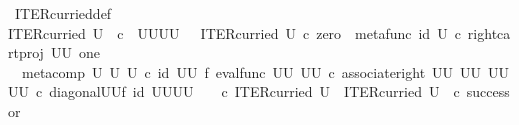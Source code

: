 \begin{isabellebody}
\isanewline
{}\isamarkupfalse%
\ ITER{\isacharunderscore}{\kern0pt}curried{\isacharunderscore}{\kern0pt}def{}{\isacharcolon}{\kern0pt}\ \isanewline
{\isachardoublequoteopen}ITER{\isacharunderscore}{\kern0pt}curried\ U\ {\isacharcolon}{\kern0pt}\ {\isasymnat}\isactrlsub c\ {\isasymrightarrow}\ {\isacharparenleft}{\kern0pt}U\isactrlbsup U\isactrlesup {\isacharparenright}{\kern0pt}\isactrlbsup U\isactrlbsup U\isactrlesup \isactrlesup \ {\isasymand}\ \ ITER{\isacharunderscore}{\kern0pt}curried\ U\ {\isasymcirc}\isactrlsub c\ zero\ {\isacharequal}{\kern0pt}\ {\isacharparenleft}{\kern0pt}metafunc\ {\isacharparenleft}{\kern0pt}id\ U{\isacharparenright}{\kern0pt}\ {\isasymcirc}\isactrlsub c\ {\isacharparenleft}{\kern0pt}right{\isacharunderscore}{\kern0pt}cart{\isacharunderscore}{\kern0pt}proj\ {\isacharparenleft}{\kern0pt}U\isactrlbsup U\isactrlesup {\isacharparenright}{\kern0pt}\ one{\isacharparenright}{\kern0pt}{\isacharparenright}{\kern0pt}\isactrlsup {\isasymsharp}\ {\isasymand}\isanewline
\ \ {\isacharparenleft}{\kern0pt}{\isacharparenleft}{\kern0pt}meta{\isacharunderscore}{\kern0pt}comp\ U\ U\ U{\isacharparenright}{\kern0pt}\ {\isasymcirc}\isactrlsub c\ {\isacharparenleft}{\kern0pt}id\ {\isacharparenleft}{\kern0pt}U\isactrlbsup U\isactrlesup {\isacharparenright}{\kern0pt}\ {\isasymtimes}\isactrlsub f\ eval{\isacharunderscore}{\kern0pt}func\ {\isacharparenleft}{\kern0pt}U\isactrlbsup U\isactrlesup {\isacharparenright}{\kern0pt}\ {\isacharparenleft}{\kern0pt}U\isactrlbsup U\isactrlesup {\isacharparenright}{\kern0pt}{\isacharparenright}{\kern0pt}\ {\isasymcirc}\isactrlsub c\ {\isacharparenleft}{\kern0pt}associate{\isacharunderscore}{\kern0pt}right\ {\isacharparenleft}{\kern0pt}U\isactrlbsup U\isactrlesup {\isacharparenright}{\kern0pt}\ {\isacharparenleft}{\kern0pt}U\isactrlbsup U\isactrlesup {\isacharparenright}{\kern0pt}\ {\isacharparenleft}{\kern0pt}{\isacharparenleft}{\kern0pt}U\isactrlbsup U\isactrlesup {\isacharparenright}{\kern0pt}\isactrlbsup U\isactrlbsup U\isactrlesup \isactrlesup {\isacharparenright}{\kern0pt}{\isacharparenright}{\kern0pt}\ {\isasymcirc}\isactrlsub c\ {\isacharparenleft}{\kern0pt}diagonal{\isacharparenleft}{\kern0pt}U\isactrlbsup U\isactrlesup {\isacharparenright}{\kern0pt}{\isasymtimes}\isactrlsub f\ id\ {\isacharparenleft}{\kern0pt}{\isacharparenleft}{\kern0pt}U\isactrlbsup U\isactrlesup {\isacharparenright}{\kern0pt}\isactrlbsup U\isactrlbsup U\isactrlesup \isactrlesup {\isacharparenright}{\kern0pt}{\isacharparenright}{\kern0pt}{\isacharparenright}{\kern0pt}\isactrlsup {\isasymsharp}\ \ \ \ {\isasymcirc}\isactrlsub c\ ITER{\isacharunderscore}{\kern0pt}curried\ U\ {\isacharequal}{\kern0pt}\ ITER{\isacharunderscore}{\kern0pt}curried\ U\ \ {\isasymcirc}\isactrlsub c\ successor{\isachardoublequoteclose}\isanewline

\end{isabellebody}
